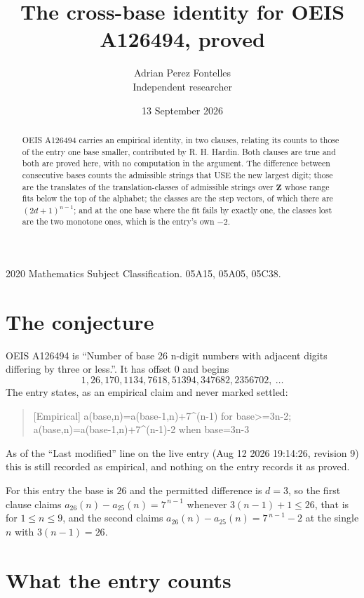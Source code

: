 \documentclass[11pt,a4paper]{article}
\title{The cross-base identity for OEIS A126494, proved}
\author{Adrian Perez Fontelles\\ \small Independent researcher}
\date{13 September 2026}
\theoremstyle{plain}
\theoremstyle{definition}
\begin{document}
\maketitle

\begin{abstract}
OEIS A126494 carries an empirical identity, in two clauses, relating its counts to those of the
entry one base smaller, contributed by R. H. Hardin. Both clauses are true and both are proved
here, with no computation in the argument. The difference between consecutive bases counts the
admissible strings that USE the new largest digit; those are the translates of the
translation-classes of admissible strings over $\mathbf{Z}$ whose range fits below the top of
the alphabet; the classes are the step vectors, of which there are $(2d+1)^{n-1}$; and at the
one base where the fit fails by exactly one, the classes lost are the two monotone ones, which
is the entry's own $-2$.
\end{abstract}

\noindent\small 2020 Mathematics Subject Classification. 05A15, 05A05, 05C38.\normalsize

\section{The conjecture}

OEIS A126494 is ``Number of base 26 n-digit numbers with adjacent digits differing by three or less.''. It has offset $0$ and begins
\[
1, 26, 170, 1134, 7618, 51394, 347682, 2356702,\ \dots
\]
The entry states, as an empirical claim and never marked settled:
\begin{quote}
[Empirical] a(base,n)=a(base-1,n)+7\textasciicircum{}(n-1) for base>=3n-2; a(base,n)=a(base-1,n)+7\textasciicircum{}(n-1)-2 when base=3n-3
\end{quote}
As of the ``Last modified'' line on the live entry (Aug 12 2026 19:14:26, revision 9)
this is still recorded as empirical, and nothing on the entry records it as proved.

For this entry the base is $26$ and the permitted difference is $d=3$, so the first clause
claims $a_{26}(n)-a_{25}(n)=7^{\,n-1}$ whenever $3(n-1)+1\le26$, that is for
$1\le n\le9$, and the second claims $a_{26}(n)-a_{25}(n)=7^{\,n-1}-2$ at the single
$n$ with $3(n-1)=26$.

\section{What the entry counts}
\end{document}
